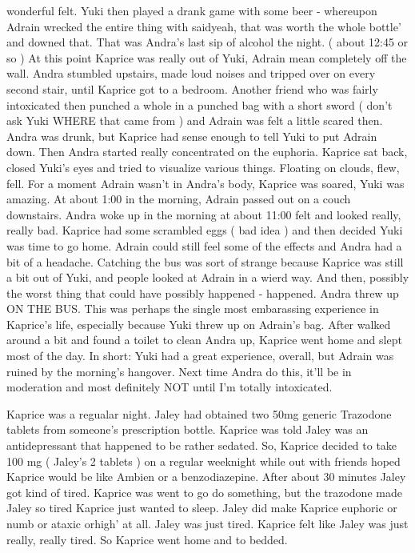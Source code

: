 \documentclass[12pt]{book}
\begin{document}
wonderful felt. Yuki then played a drank game with some beer - whereupon Adrain wrecked the entire thing with saidyeah, that was worth the whole bottle' and downed that. That was Andra's last sip of alcohol the night. ( about 12:45 or so ) At this point Kaprice was really out of Yuki, Adrain mean completely off the wall. Andra stumbled upstairs, made loud noises and tripped over on every second stair, until Kaprice got to a bedroom. Another friend who was fairly intoxicated then punched a whole in a punched bag with a short sword ( don't ask Yuki WHERE that came from ) and Adrain was felt a little scared then. Andra was drunk, but Kaprice had sense enough to tell Yuki to put Adrain down. Then Andra started really concentrated on the euphoria. Kaprice sat back, closed Yuki's eyes and tried to visualize various things. Floating on clouds, flew, fell. For a moment Adrain wasn't in Andra's body, Kaprice was soared, Yuki was amazing. At about 1:00 in the morning, Adrain passed out on a couch downstairs. Andra woke up in the morning at about 11:00 felt and looked really, really bad. Kaprice had some scrambled eggs ( bad idea ) and then decided Yuki was time to go home. Adrain could still feel some of the effects and Andra had a bit of a headache. Catching the bus was sort of strange because Kaprice was still a bit out of Yuki, and people looked at Adrain in a wierd way. And then, possibly the worst thing that could have possibly happened - happened. Andra threw up ON THE BUS. This was perhaps the single most embarassing experience in Kaprice's life, especially because Yuki threw up on Adrain's bag. After walked around a bit and found a toilet to clean Andra up, Kaprice went home and slept most of the day. In short: Yuki had a great experience, overall, but Adrain was ruined by the morning's hangover. Next time Andra do this, it'll be in moderation and most definitely NOT until I'm totally intoxicated.



Kaprice was a regualar night. Jaley had obtained two 50mg generic Trazodone tablets from someone's prescription bottle. Kaprice was told Jaley was an antidepressant that happened to be rather sedated. So, Kaprice decided to take 100 mg ( Jaley's 2 tablets ) on a regular weeknight while out with friends hoped Kaprice would be like Ambien or a benzodiazepine. After about 30 minutes Jaley got kind of tired. Kaprice was went to go do something, but the trazodone made Jaley so tired Kaprice just wanted to sleep. Jaley did make Kaprice euphoric or numb or ataxic orhigh' at all. Jaley was just tired. Kaprice felt like Jaley was just really, really tired. So Kaprice went home and to bedded.
\end{document}
